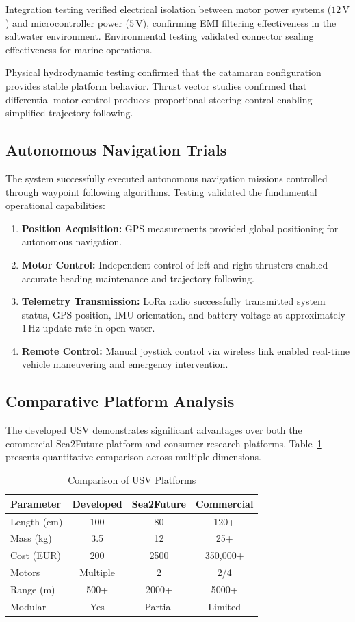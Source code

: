 \documentclass[conference]{IEEEtran}
\begin{document}
Integration testing verified electrical isolation between motor power systems ($12 \, \mathrm{V}$) and microcontroller power ($5 \, \mathrm{V}$), confirming EMI filtering effectiveness in the saltwater environment. Environmental testing validated connector sealing effectiveness for marine operations.

Physical hydrodynamic testing confirmed that the catamaran configuration provides stable platform behavior. Thrust vector studies confirmed that differential motor control produces proportional steering control enabling simplified trajectory following.

\subsection{Autonomous Navigation Trials}
The system successfully executed autonomous navigation missions controlled through waypoint following algorithms. Testing validated the fundamental operational capabilities:

\begin{enumerate}
  \item \textbf{Position Acquisition:} GPS measurements provided global positioning for autonomous navigation.
  \item \textbf{Motor Control:} Independent control of left and right thrusters enabled accurate heading maintenance and trajectory following.
  \item \textbf{Telemetry Transmission:} LoRa radio successfully transmitted system status, GPS position, IMU orientation, and battery voltage at approximately $1 \, \mathrm{Hz}$ update rate in open water.
  \item \textbf{Remote Control:} Manual joystick control via wireless link enabled real-time vehicle maneuvering and emergency intervention.
\end{enumerate}

\subsection{Comparative Platform Analysis}
The developed USV demonstrates significant advantages over both the commercial Sea2Future platform and consumer research platforms. Table~\ref{tab:comparison2} presents quantitative comparison across multiple dimensions.

\begin{table}[htbp]
\centering
\caption{Comparison of USV Platforms}
\label{tab:comparison2}
\begin{tabular}{|l|c|c|c|}
\hline
\textbf{Parameter} & \textbf{Developed} & \textbf{Sea2Future} & \textbf{Commercial} \\
\hline
Length (cm) & 100 & 80 & 120+ \\
Mass (kg) & 3.5 & 12 & 25+ \\
Cost (EUR) & 200 & 2500 &  350,000+ \\
Motors & Multiple & 2 & 2/4 \\
Range (m) & 500+ & 2000+ & 5000+ \\
Modular & Yes & Partial & Limited \\
\hline
\end{tabular}
\end{table}
\end{document}
